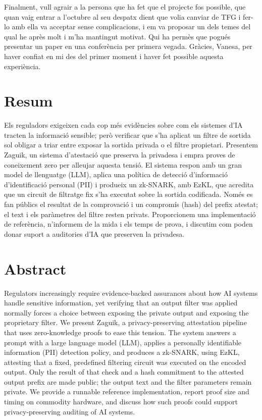 \documentclass[11pt, a4paper, twoside, openany]{tfg_dtic_upf}
\let\cleardoublepage\clearpage
\theoremstyle{definition}
\theoremstyle{plain}
\numberwithin{equation}{section}
\begin{document}
\medskip

Finalment, vull agrair a la persona que ha fet que el projecte fos possible, que quan vaig entrar a l'octubre al seu despatx dient que volia canviar de TFG i fer-lo amb ella va acceptar sense complicacions, i em va proposar un dels temes del qual he après molt i m'ha mantingut motivat. Qui ha permès que pogués presentar un paper en una conferència per primera vegada. Gràcies, Vanesa, per haver confiat en mi des del primer moment i haver fet possible aquesta experiència.


\cleardoublepage

\section*{\Large \sffamily Resum}
Els reguladors exigeixen cada cop més evidències sobre com els sistemes d'IA tracten la informació sensible; però verificar que s'ha aplicat un filtre de sortida sol obligar a triar entre exposar la sortida privada o el filtre propietari. Presentem Zaguik, un sistema d'atestació que preserva la privadesa i empra proves de coneixement zero per alleujar aquesta tensió. El sistema respon amb un gran model de llenguatge (LLM), aplica una política de detecció d'informació d'identificació personal (PII) i produeix un zk-SNARK, amb EzKL, que acredita que un circuit de filtratge fix s'ha executat sobre la sortida codificada. Només es fan públics el resultat de la comprovació i un compromís (hash) del prefix atestat; el text i els paràmetres del filtre resten privats. Proporcionem una implementació de referència, n'informem de la mida i els temps de prova, i discutim com poden donar suport a auditories d'IA que preserven la privadesa.

\vspace*{\fill}

\section*{\Large \sffamily Abstract}
Regulators increasingly require evidence-backed assurances about how AI systems
handle sensitive information, yet verifying that an output filter was applied
normally forces a choice between exposing the private output and exposing the
proprietary filter. We present Zaguik, a privacy-preserving attestation pipeline
that uses zero-knowledge proofs to ease this tension. The system answers a prompt
with a large language model (LLM), applies a personally identifiable information
(PII) detection policy, and produces a zk-SNARK, using EzKL, attesting that a
fixed, predefined filtering circuit was executed on the encoded output. Only the
result of that check and a hash commitment to the attested output prefix are made
public; the output text and the filter parameters remain private. We provide a
runnable reference implementation, report proof size and timing on commodity
hardware, and discuss how such proofs could support privacy-preserving auditing
of AI systems.
\end{document}

